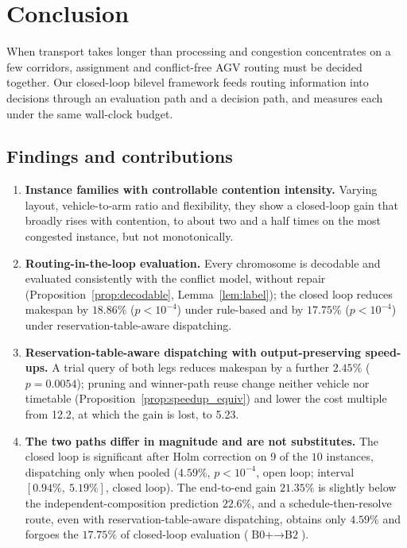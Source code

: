 \documentclass[preprint,review,12pt,authoryear]{elsarticle}
\newcommand{\NCases}{10}
\newcommand{\GainLoopRule}{18.86\%}      %
\newcommand{\PLoopRule}{<10^{-4}}
\newcommand{\GainLoopProbe}{17.75\%}     %
\newcommand{\PLoopProbe}{<10^{-4}}
\newcommand{\GainProbeOpen}{4.59\%}      %
\newcommand{\PProbeOpen}{<10^{-4}}
\newcommand{\GainProbeLoop}{2.45\%}      %
\newcommand{\PProbeLoop}{=0.0054}
\newcommand{\GainEndToEnd}{21.35\%}      %
\newcommand{\CIProbeLoop}{$[0.94\%,\ 5.19\%]$}
\newcommand{\GainIndepProduct}{22.6\%}
\newcommand{\CellsSigLoopAdj}{9}
\newcommand{\CostMultBefore}{12.2}
\newcommand{\CostMultAfter}{5.23}
\begin{document}



\section{Conclusion}

When transport takes longer than processing and congestion concentrates on a few corridors, assignment and conflict-free AGV routing must be decided together. Our closed-loop bilevel framework feeds routing information into decisions through an evaluation path and a decision path, and measures each under the same wall-clock budget.

\subsection{Findings and contributions}
\label{sec:contributions}

\begin{enumerate}[leftmargin=*,topsep=2pt,itemsep=2pt]
\item \textbf{Instance families with controllable contention intensity.} Varying layout, vehicle-to-arm ratio and flexibility, they show a closed-loop gain that broadly rises with contention, to about two and a half times on the most congested instance, but not monotonically.
\item \textbf{Routing-in-the-loop evaluation.} Every chromosome is decodable and evaluated consistently with the conflict model, without repair (Proposition~\ref{prop:decodable}, Lemma~\ref{lem:label}); the closed loop reduces makespan by $\GainLoopRule$ ($p\PLoopRule$) under rule-based and by $\GainLoopProbe$ ($p\PLoopProbe$) under reservation-table-aware dispatching.
\item \textbf{Reservation-table-aware dispatching with output-preserving speed-ups.} A trial query of both legs reduces makespan by a further $\GainProbeLoop$ ($p\PProbeLoop$); pruning and winner-path reuse change neither vehicle nor timetable (Proposition~\ref{prop:speedup_equiv}) and lower the cost multiple from \CostMultBefore{}, at which the gain is lost, to \CostMultAfter{}.
\item \textbf{The two paths differ in magnitude and are not substitutes.} The closed loop is significant after Holm correction on \CellsSigLoopAdj{} of the $\NCases$ instances, dispatching only when pooled ($\GainProbeOpen$, $p\PProbeOpen$, open loop; interval \CIProbeLoop{}, closed loop). The end-to-end gain $\GainEndToEnd$ is slightly below the independent-composition prediction $\GainIndepProduct$, and a schedule-then-resolve route, even with reservation-table-aware dispatching, obtains only $\GainProbeOpen$ and forgoes the $\GainLoopProbe$ of closed-loop evaluation ($\text{B0+}\to\text{B2}$).
\end{enumerate}
\end{document}
